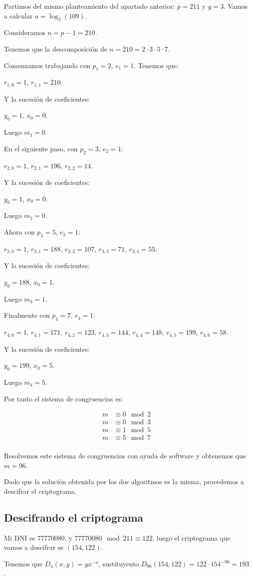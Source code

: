 \documentclass[a4paper]{article}
\begin{document}
Partimos del mismo planteamiento del apartado anterior: $p=211$ y $g=3$. Vamos a calcular $a=\log_3 (109)$.

Consideramos $n=p-1=210$.

Tenemos que la descomposición de $n=210=2 \cdot 3 \cdot 5\cdot 7$.

Comenzamos trabajando con $p_1=2$, $e_1=1$. Tenemos que:

$r_{1,0}=1$, $r_{1,1}=210$.

Y la sucesión de coeficientes:

$y_0 = 1$, $x_0 = 0$.

Luego $m_1=0$.

En el siguiente paso, con $p_2=3$, $e_2=1$:

$r_{2,0}=1$, $r_{2,1}=196$, $r_{2,2}=14$.

Y la sucesión de coeficientes:

$y_0 = 1$, $x_0 = 0$.

Luego $m_2=0$.

Ahora con $p_3=5$, $e_3=1$:

$r_{3,0}=1$, $r_{3,1}=188$, $r_{3,2}=107$, $r_{3,3}=71$, $r_{3,4}=55$.

Y la sucesión de coeficientes:

$y_0 = 188$, $x_0 = 1$.

Luego $m_3=1$.

Finalmente con $p_4=7$, $e_4=1$:

$r_{4,0}=1$, $r_{4,1}=171$, $r_{4,2}=123$, $r_{4,3}=144$, $r_{4,4}=148$, $r_{4,5}=199$, $r_{4,6}=58$.

Y la sucesión de coeficientes:

$y_0 = 199$, $x_0 = 5$.

Luego $m_4=5$.

Por tanto el sistema de congruencias es:

\begin{equation}
\begin{aligned}
m & \equiv 0 \mod 2 \\
m & \equiv 0 \mod 3 \\
m & \equiv 1 \mod 5 \\
m & \equiv 5 \mod 7 \\
\end{aligned}
\end{equation}

Resolvemos este sistema de congruencias con ayuda de software y obtenemos que $m=96$.

Dado que la solución obtenida por los dos algoritmos es la misma, procedemos a descifrar el criptograma.

\subsection{Descifrando el criptograma}

Mi DNI es 77770080, y $77770080 \mod 211 \equiv 122$, luego el criptograma que vamos a descifrar es $(154,122)$.

Tenemos que $D_{a}(x,y)=yx^{-a}$, sustituyento $D_{96}(154,122)=122 \cdot 154^{-96}=193$.
\end{document}

